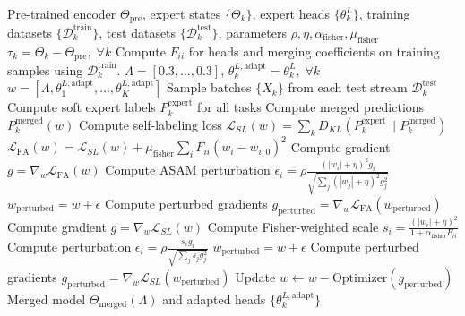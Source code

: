 \documentclass{article}
\theoremstyle{plain}
\theoremstyle{definition}
\theoremstyle{remark}
\begin{document}
\begin{algorithm}[tb]
\caption{Unified Fisher-weighted Test-Time Merging}
\label{alg:unified}
\begin{algorithmic}[1]
 Pre-trained encoder $\Theta_{\text{pre}}$, expert states $\{\Theta_k\}$, expert heads $\{\theta_k^L\}$, training datasets $\{\mathcal{D}_k^{\text{train}}\}$, test datasets $\{\mathcal{D}_k^{\text{test}}\}$, parameters $\rho, \eta, \alpha_{\text{fisher}}, \mu_{\text{fisher}}$
 $\tau_k = \Theta_k - \Theta_{\text{pre}}, \; \forall k$
 Compute $F_{ii}$ for heads and merging coefficients on training samples using $\mathcal{D}_k^{\text{train}}$.
 $\Lambda = [0.3, \dots, 0.3]$, $\theta_k^{L,\text{adapt}} = \theta_k^L, \; \forall k$
\STATE $w = [\Lambda, \theta_1^{L,\text{adapt}}, \dots, \theta_K^{L,\text{adapt}}]$
    \STATE Sample batches $\{X_k\}$ from each test stream $\mathcal{D}_k^{\text{test}}$
    \STATE Compute soft expert labels $P_k^{\text{expert}}$ for all tasks
    \STATE Compute merged predictions $P_k^{\text{merged}}(w)$
    \STATE Compute self-labeling loss $\mathcal{L}_{SL}(w) = \sum_k D_{KL}(P_k^{\text{expert}} \parallel P_k^{\text{merged}})$
        \STATE $\mathcal{L}_{\text{FA}}(w) = \mathcal{L}_{SL}(w) + \mu_{\text{fisher}} \sum_i F_{ii} (w_i - w_{i,0})^2$
        \STATE Compute gradient $g = \nabla_w \mathcal{L}_{\text{FA}}(w)$
        \STATE Compute ASAM perturbation $\epsilon_i = \rho \frac{(|w_i| + \eta)^2 g_i}{\sqrt{\sum_j (|w_j| + \eta)^2 g_j^2}}$
        \STATE $w_{\text{perturbed}} = w + \epsilon$
        \STATE Compute perturbed gradients $g_{\text{perturbed}} = \nabla_w \mathcal{L}_{\text{FA}}(w_{\text{perturbed}})$
        \STATE Compute gradient $g = \nabla_w \mathcal{L}_{SL}(w)$
        \STATE Compute Fisher-weighted scale $s_i = \frac{(|w_i| + \eta)^2}{1 + \alpha_{\text{fisher}} F_{ii}}$
        \STATE Compute perturbation $\epsilon_i = \rho \frac{s_i g_i}{\sqrt{\sum_j s_j g_j^2}}$
        \STATE $w_{\text{perturbed}} = w + \epsilon$
        \STATE Compute perturbed gradients $g_{\text{perturbed}} = \nabla_w \mathcal{L}_{SL}(w_{\text{perturbed}})$
    \ENDIF
    \STATE Update $w \leftarrow w - \text{Optimizer}(g_{\text{perturbed}})$
\ENDFOR
{} Merged model $\Theta_{\text{merged}}(\Lambda)$ and adapted heads $\{\theta_k^{L,\text{adapt}}\}$
\end{algorithmic}
\end{algorithm}
\end{document}
